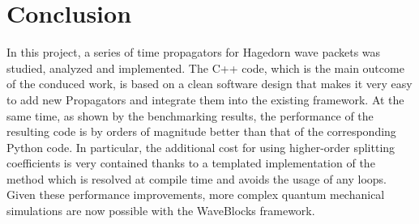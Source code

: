\section{Conclusion}
%
In this project, a series of time propagators for Hagedorn wave packets was studied, analyzed and implemented.
The C++ code, which is the main outcome of the conduced work, is based on a clean software design that makes it very easy to add new Propagators and integrate them into the existing framework.
At the same time, as shown by the benchmarking results, the performance of the resulting code is by orders of magnitude better than that of the corresponding Python code.
In particular, the additional cost for using higher-order splitting coefficients is very contained thanks to a templated implementation of the  method which is resolved at compile time and avoids the usage of any loops.
Given these performance improvements, more complex quantum mechanical simulations are now possible with the WaveBlocks framework.
